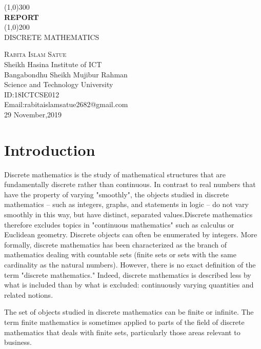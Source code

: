 \documentclass{article}
\begin{document}
\begin{titlepage}
\begin{center} 
\line(1,0){300}\\
[0.25in]
\huge{\bfseries REPORT}\\
[2mm]
\line(1,0){200}\\
[.5cm]
\textsc{\LARGE DISCRETE MATHEMATICS}\\
[5cm]
\end{center}
\begin{flushright}
\textsc{\Large Rabita Islam Satue\\}
Sheikh Hasina Institute of ICT\\
Bangabondhu Sheikh Mujibur Rahman\\ Science and Technology University\\
ID:18ICTCSE012\\
Email:rabitaislamsatue2682@gmail.com\\
29 November,2019
\end{flushright}
\end{titlepage}
\tableofcontents
\thispagestyle{empty}
\cleardoublepage
\setcounter{page}{1}
\section{Introduction}\label{sec:intro}

Discrete mathematics is the study of mathematical structures that are fundamentally discrete rather than continuous. In contrast to real numbers that have the property of varying "smoothly", the objects studied in discrete mathematics – such as integers, graphs, and statements in logic – do not vary smoothly in this way, but have distinct, separated values.Discrete mathematics therefore excludes topics in "continuous mathematics" such as calculus or Euclidean geometry. Discrete objects can often be enumerated by integers. More formally, discrete mathematics has been characterized as the branch of mathematics dealing with countable sets (finite sets or sets with the same cardinality as the natural numbers). However, there is no exact definition of the term "discrete mathematics." Indeed, discrete mathematics is described less by what is included than by what is excluded: continuously varying quantities and related notions.

The set of objects studied in discrete mathematics can be finite or infinite. The term finite mathematics is sometimes applied to parts of the field of discrete mathematics that deals with finite sets, particularly those areas relevant to business.
\end{document}
